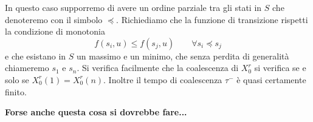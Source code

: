 \documentclass[]{marticle}
\begin{document}
In questo caso supporremo di avere un ordine parziale tra gli stati in $S$ che
denoteremo con il simbolo $\preceq$. Richiediamo che la funzione di transizione
rispetti la condizione di monotonia
\[
    f(s_i, u) \leq f(s_j, u) \qquad \forall s_i \preceq s_j
\]
e che esistano in $S$ un massimo e un minimo, che senza perdita di generalit\`a
chiameremo $s_1$ e $s_n$. Si verifica facilmente che la coalescenza di $X^r_0$
si verifica se e solo se $X^r_0(1) = X^r_0(n)$. Inoltre il tempo di coalescenza
$\tau^-$ \`e quasi certamente finito. 

\textbf{Forse anche questa cosa si dovrebbe fare...}
\end{document}
